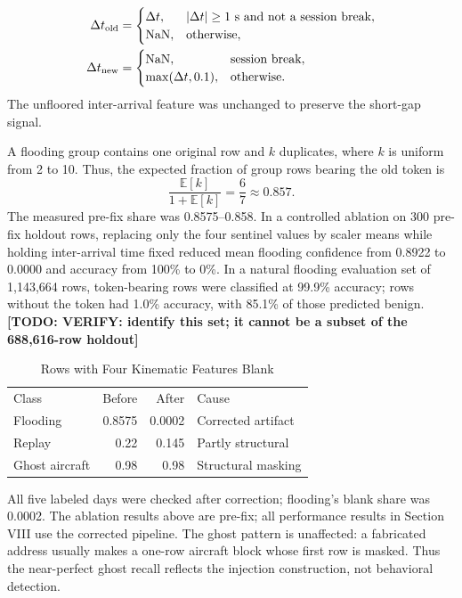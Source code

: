 \documentclass[conference]{IEEEtran}
\newcommand{\todo}[1]{\textbf{[TODO: #1]}}
\begin{document}
\begin{align}
\Delta t_{\rm old}&=\begin{cases}
\Delta t,& |\Delta t|\geq1\text{ s and not a session break},\\
\mathrm{NaN},&\text{otherwise},
\end{cases}\\
\Delta t_{\rm new}&=\begin{cases}
\mathrm{NaN},&\text{session break},\\
\max(\Delta t,0.1),&\text{otherwise}.
\end{cases}
\end{align}
The unfloored inter-arrival feature was unchanged to preserve the short-gap signal.

A flooding group contains one original row and $k$ duplicates, where $k$ is uniform from 2 to 10. Thus, the expected fraction of group rows bearing the old token is
\begin{equation}\frac{\mathbb{E}[k]}{1+\mathbb{E}[k]}=\frac{6}{7}\approx0.857.\end{equation}
The measured pre-fix share was 0.8575--0.858. In a controlled ablation on 300 pre-fix holdout rows, replacing only the four sentinel values by scaler means while holding inter-arrival time fixed reduced mean flooding confidence from 0.8922 to 0.0000 and accuracy from 100\% to 0\%. In a natural flooding evaluation set of 1,143,664 rows, token-bearing rows were classified at 99.9\% accuracy; rows without the token had 1.0\% accuracy, with 85.1\% of those predicted benign. \todo{VERIFY: identify this set; it cannot be a subset of the 688,616-row holdout}
\begin{table}[t]\caption{Rows with Four Kinematic Features Blank}\label{tab:blank}\centering\footnotesize
\begin{tabular}{lrrl}\toprule Class & Before & After & Cause \\
Flooding & 0.8575 & 0.0002 & Corrected artifact \\
Replay & 0.22 & 0.145 & Partly structural \\
Ghost aircraft & 0.98 & 0.98 & Structural masking \\
\bottomrule\end{tabular}\end{table}
All five labeled days were checked after correction; flooding's blank share was 0.0002. The ablation results above are pre-fix; all performance results in Section VIII use the corrected pipeline. The ghost pattern is unaffected: a fabricated address usually makes a one-row aircraft block whose first row is masked. Thus the near-perfect ghost recall reflects the injection construction, not behavioral detection.
\end{document}

